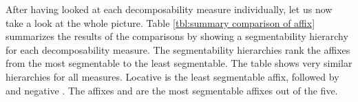                                                                
After having looked at each decomposability measure individually, let us now take a look at the whole picture. Table \ref{tbl:summary comparison of affix} summarizes the results of the comparisons by showing a segmentability hierarchy for each decomposability measure. The segmentability hierarchies rank the affixes from the most segmentable to the least segmentable. The table shows very similar hierarchies for all measures. Locative  is the least segmentable affix, followed by  and negative . The affixes  and  are the most segmentable affixes out of the five. 


\begin{table}[h!]
	\caption{Segmentability hierarchies for each decomposability measure}
	\label{tbl:summary comparison of affix}
	\begin{center}
	\end{center}
\end{table}




